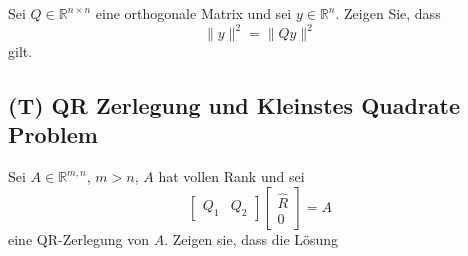 \documentclass[]{book}
\theoremstyle{definition}
\theoremstyle{definition}
\theoremstyle{definition}
\theoremstyle{definition}
\theoremstyle{remark}
\begin{document}
Sei \(Q\in \mathbb R^{n\times n}\) eine orthogonale Matrix und sei \(y\in \mathbb R^{n}\). Zeigen Sie, dass
\begin{equation*}
\|y\|^2 = \|Qy \|^2
\end{equation*}
gilt.

\hypertarget{t-qr-zerlegung-und-kleinstes-quadrate-problem}{%
\subsection{(T) QR Zerlegung und Kleinstes Quadrate Problem}\label{t-qr-zerlegung-und-kleinstes-quadrate-problem}}

Sei \(A\in \mathbb R^{m,n}\), \(m>n\), \(A\) hat vollen Rank und sei
\begin{equation*}
\begin{bmatrix}
Q_1 & Q_2
\end{bmatrix}
\begin{bmatrix}
\hat R \\ 0
\end{bmatrix} = A
\end{equation*}
eine QR-Zerlegung von \(A\). Zeigen sie, dass die Lösung
\end{document}
